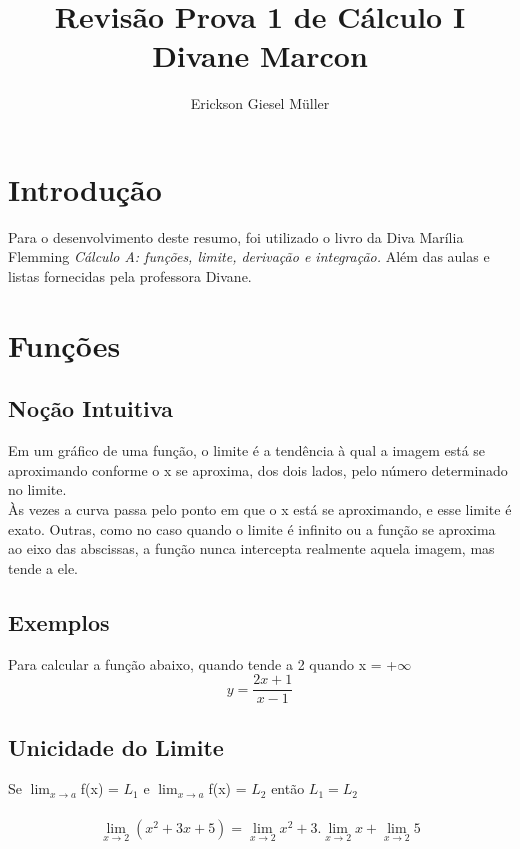 \documentclass{article}
\title{Revisão Prova 1 de Cálculo I\\Divane Marcon}
\author{Erickson Giesel Müller}
\begin{document}
	\maketitle
	
	\section{Introdução}
		Para o desenvolvimento deste resumo, foi utilizado o livro da Diva Marília Flemming \textit{ Cálculo A: funções, limite, derivação e integração.}
		Além das aulas e listas fornecidas pela professora Divane.\\
		
	\section{Funções}
		\subsection{Noção Intuitiva}
			Em um gráfico de uma função, o limite é a tendência à qual a imagem está se aproximando conforme o x se aproxima, dos dois lados, pelo número determinado no limite.\\
			Às vezes a curva passa pelo ponto em que o x está se aproximando, e esse limite é exato. Outras, como no caso quando o limite é infinito ou a função se aproxima ao eixo das abscissas, a função nunca intercepta realmente aquela imagem, mas tende a ele.
			
		\subsection{Exemplos}
			Para calcular a função abaixo, quando tende a 2 quando x = +$\infty$
			\begin{equation*}
				y = \frac{2x+1}{x-1}
			\end{equation*}
		\subsection{Unicidade do Limite}
			Se $\lim_{x\to a}$f(x) = $L_{1}$ e $\lim_{x\to a}$f(x) = $L_{2}$ então $L_{1} = L_{2}$
			\\ \\
			\[ \lim_{x\to 2}(x^2+3x+5) = \lim_{x\to 2}x^2 + 3.\lim_{x\to 2}x + \lim_{x\to 2}5 \]
\end{document}
